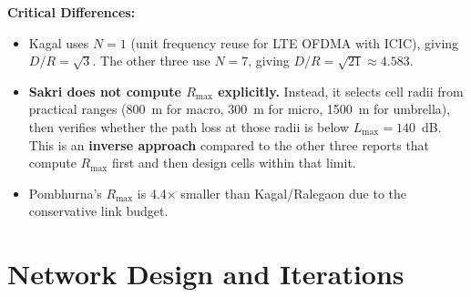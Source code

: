 \documentclass[11pt,a4paper]{article}
\begin{document}
\noindent\textbf{Critical Differences:}
\begin{itemize}
    \item Kagal uses $N=1$ (unit frequency reuse for LTE OFDMA with ICIC), giving $D/R = \sqrt{3}$. The other three use $N=7$, giving $D/R = \sqrt{21} \approx 4.583$.
    \item \textcolor{accentred}{\textbf{Sakri does not compute $R_{\max}$ explicitly.}} Instead, it selects cell radii from practical ranges (800~m for macro, 300~m for micro, 1500~m for umbrella), then verifies whether the path loss at those radii is below $L_{\max} = 140$~dB. This is an \textbf{inverse approach} compared to the other three reports that compute $R_{\max}$ first and then design cells within that limit.
    \item Pombhurna's $R_{\max}$ is 4.4$\times$ smaller than Kagal/Ralegaon due to the conservative link budget.
\end{itemize}

\section{Network Design and Iterations}
\label{sec:network}
\end{document}
